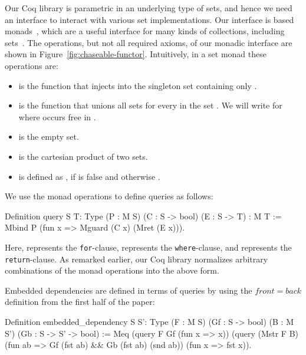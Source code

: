 \documentclass[preprint]{sigplanconf}
\begin{document}
Our Coq library is parametric in an underlying type of sets, and hence we need an interface to interact with various set implementations.  Our interface is based monads~\cite{monad}, which are a useful interface for many kinds of collections, including sets~\cite{monad}.  The operations, but not all required axioms, of our monadic interface are shown in Figure~\ref{fig:chaseable-functor}.  Intuitively, in a set monad these operations are:
\begin{itemize}
\item {} is the function that injects  into the singleton set containing only .
\item {} is the function that unions all sets  for every  in the set .  We will write  for  where  occurs free in .
\item {} is the empty set.
\item {} is the cartesian product of two sets.
\item {} is defined as , if  is false and otherwise .
\end{itemize}

We use the monad operations to define queries as follows:
\begin{coq}
Definition query {S T: Type}
  (P : M S) (C : S -> bool) (E : S -> T) : M T :=
  Mbind P (fun x => Mguard (C x) (Mret (E x))).
\end{coq}
Here,  represents the {\tt for}-clause,  represents the {\tt where}-clause, and  represents the {\tt return}-clause.  As remarked earlier, our Coq library normalizes arbitrary combinations of the monad operations into the above form.

Embedded dependencies are defined in terms of queries by using the $front = back$ definition from the first half of the paper: 
\begin{coq}
Definition embedded_dependency {S S': Type}
  (F : M S) (Gf : S -> bool) (B : M S') (Gb : S -> S' -> bool)
:= Meq (query F Gf (fun x => x))
       (query (Mstr F B)
              (fun ab => Gf (fst ab) && Gb (fst ab) (snd ab))
              (fun x => fst x)).
\end{coq}



\end{document}
